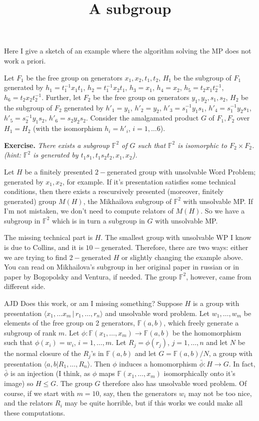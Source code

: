 \documentclass[a4paper,12pt]{article}
\title{A subgroup}
\numberwithin{equation}{section}
\numberwithin{figure}{section}
\newcommand{\FF}{\ensuremath{\mathbb{F}}}
\newcommand{\la}{\langle}
\newcommand{\ra}{\rangle}
\newcommand{\maps}{\rightarrow}
\newenvironment{ajd1}{\noindent\color{red} AJD }{}
\newcommand{\ajd}[1]{\begin{ajd1} #1 \end{ajd1}}
\begin{document}
Here I give a sketch of an example where the algorithm solving the MP does not work a priori.


Let $F_1$ be the free group on generators $x_1,x_2, t_1, t_2$,
$H_1$ be the subgroup of $F_1$ generated by 
$h_1= t_1^{-1} x_1 t_1$, 
$h_2 = t_1^{-1} x_2 t_1$, 
$h_3 =x_1$, 
$h_4 = x_2$,
$h_5= t_2 x_1 t_2^{-1}$, 
$h_6 = t_2 x_2 t_2^{-1}$.
Further, let $F_2$ be the free group on generators $y_1, y_2, s_1, s_2$,
$H_2$ be the subgroup of $F_2$ generated by 
$h'_1= y_1$, 
$h'_2 = y_2$, 
$h'_3 = s_1^{-1} y_1 s_1 $, 
$h'_4 = s_1^{-1} y_2 s_1$,
$h'_5= s_2^{-1} y_1 s_2$, 
$h'_6 = s_2 y_2 s_2$.
Consider the amalgamated product $G$ of $F_1, F_2$ over $H_1=H_2$ (with the isomorphism $h_i = h'_i$, $i = 1,\ldots 6$).

{\bf Exercise.} {\it There exists a subgroup $\mathbb{F}^2$ of $G$ such that $\mathbb{F}^2$ is isomorphic to $F_2 \times F_2$.
(hint: $\mathbb{F}^2$ is generated by $t_1s_1, t_1s_2t_2, x_1, x_2$).}

Let $H$ be a finitely presented $2-$generated group with unsolvable Word Problem; generated by $x_1, x_2$, for example. If it's presentation satisfies some technical conditions, then there exists a rescursively presented (moreover, finitely generated) group $M(H)$, the Mikhailova subgroup of $\mathbb{F}^2$ with unsolvable MP.
If I'm not mistaken, we don't need to compute relators of $M(H)$. So we have a subgroup in $\mathbb{F}^2$ which is in turn a subgroup in $G$ with unsolvable MP.

The missing technical part is $H$. The smallest group with unsolvable WP I know is due to Collins, and it is $10-$generated. Therefore, there are two ways: either we are trying to find $2-$generated $H$ or slightly changing the example above.
You can read on Mikhailova's subgroup in her original paper in russian or in paper by Bogopolsky and Ventura, if needed. 
The group $\mathbb{F}^2$, however, came from different side.

\ajd{Does this work, or am I missing something? Suppose $H$ is a group
with presentation $\la x_1, \ldots x_m\,|\, r_1,\ldots ,r_n\ra$ and unsolvable
word problem. Let $w_1, \ldots , w_m$ be elements of the free group on
2 generators, $\FF(a,b)$, which freely generate a subgroup of rank $m$. 
Let $\phi:\FF(x_1,\ldots, x_m) \maps \FF(a,b)$ 
be the homomorphism such that $\phi(x_i)=w_i$, 
$i=1,\ldots, m$. 
Let $R_j=\phi(r_j)$, $j=1,\ldots ,n$ and let $N$ be the normal closure of 
the $R_j$'s in $\FF(a,b)$ and let $G=\FF(a,b)/N$, a group with presentation
$\la a, b|R_1, \ldots, R_n\ra$. 
Then $\phi$ induces a homomorphism $\bar\phi:H\maps  G$. 
In fact, $\bar\phi$ is an injection (I think, as $\phi$ maps $\FF(x_1,\ldots ,x_{m})$ 
isomorphically onto it's image) so $H\le G$. The group $G$ therefore also has
unsolvable word problem.  
Of course, if we start with $m=10$, say, then 
 the generators $w_i$ may not be too nice,
and the relators $R_i$ may be quite horrible, but if this works we could 
make all these computations.}
\end{document}
